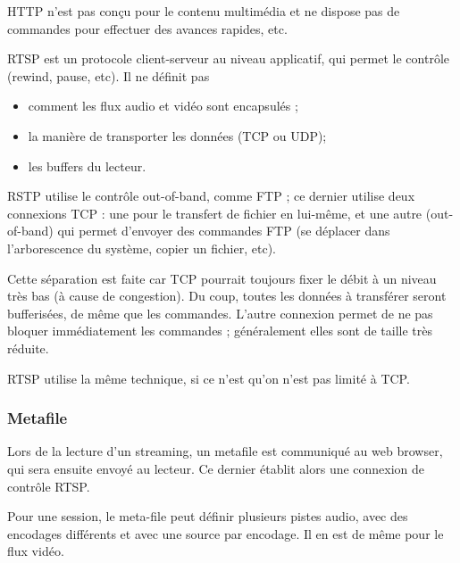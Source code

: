 		HTTP n'est pas conçu pour le contenu multimédia et ne dispose pas de commandes pour effectuer des avances rapides, etc.
		
		RTSP est un protocole client-serveur au niveau applicatif, qui permet le contrôle (rewind, pause, etc). Il ne définit pas
		
		\begin{itemize}
			\item comment les flux audio et vidéo sont encapsulés ;
			\item la manière de transporter les données (TCP ou UDP);
			\item les buffers du lecteur.
		\end{itemize}
		
		RSTP utilise le contrôle out-of-band, comme FTP ; ce dernier utilise deux connexions TCP : une pour le transfert de fichier en lui-même, et une autre (out-of-band) qui permet d'envoyer des commandes FTP (se déplacer dans l'arborescence du système, copier un fichier, etc).
		
		Cette séparation est faite car TCP pourrait toujours fixer le débit à un niveau très bas (à cause de congestion). Du coup, toutes les données à transférer seront bufferisées, de même que les commandes. L'autre connexion permet de ne pas bloquer immédiatement les commandes ; généralement elles sont de taille très réduite.
		
		RTSP utilise la même technique, si ce n'est qu'on n'est pas limité à TCP.
		
		
			\subsubsection{Metafile}
			
			Lors de la lecture d'un streaming, un metafile est communiqué au web browser, qui sera ensuite envoyé au lecteur. Ce dernier établit alors une connexion de contrôle RTSP.
			
			Pour une session, le meta-file peut définir plusieurs pistes audio, avec des encodages différents et avec une source par encodage. Il en est de même pour le flux vidéo.
			
